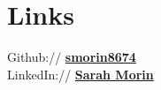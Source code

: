 \documentclass[]{deedy-resume-openfont}
\begin{document}
\begin{minipage}[t]{0.33\textwidth}




        \section{Links}
        Github:// \href{https://github.com/smorin8674}{\bf smorin8674}\\
        LinkedIn://  \href{https://www.linkedin.com/in/sarah-morin-500603165/}{\bf Sarah Morin} \\





\end{minipage}
\hfill
\end{document}
